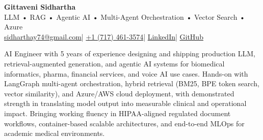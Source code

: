 \documentclass[letterpaper,9.5pt]{article}
\newcommand{\resumeSection}[1]{%
  \vspace{3pt}\noindent{\large\bfseries\color{linkblue}#1}\par
  \vspace{-3pt}\noindent{\color{linkblue}\rule{\textwidth}{0.45pt}}\vspace{1pt}%
}
\begin{document}
\begin{center}
  {\Huge\bfseries Gittaveni Sidhartha}\\[2pt]
  {\large LLM • RAG • Agentic AI • Multi-Agent Orchestration • Vector Search • Azure}\\[4pt]
  {\small
    \href{mailto:sidharthay74@gmail.com}{sidharthay74@gmail.com}\enspace|\enspace
    \href{tel:+17174613574}{+1 (717) 461-3574}\enspace|\enspace
    \href{https://www.linkedin.com/in/sidharthay74/}{LinkedIn}\enspace|\enspace
    \href{https://github.com/zentrium74}{GitHub}
  }
\end{center}
\vspace{-3pt}

\resumeSection{Summary}
AI Engineer with 5 years of experience designing and shipping production LLM, retrieval-augmented generation, and agentic AI systems for biomedical informatics, pharma, financial services, and voice AI use cases. Hands-on with LangGraph multi-agent orchestration, hybrid retrieval (BM25, BPE token search, vector similarity), and Azure/AWS cloud deployment, with demonstrated strength in translating model output into measurable clinical and operational impact. Bringing working fluency in HIPAA-aligned regulated document workflows, container-based scalable architectures, and end-to-end MLOps for academic medical environments.
\end{document}
